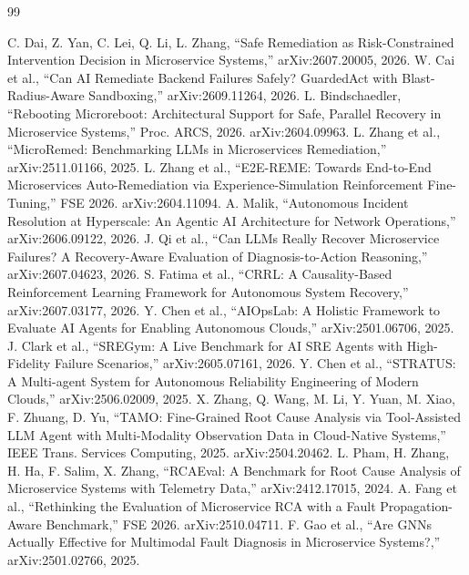 \begin{thebibliography}{99}
\setlength{\itemsep}{2pt}
\small
{} C. Dai, Z. Yan, C. Lei, Q. Li, L. Zhang, ``Safe Remediation as Risk-Constrained Intervention Decision in Microservice Systems,'' arXiv:2607.20005, 2026.
 W. Cai et al., ``Can AI Remediate Backend Failures Safely? GuardedAct with Blast-Radius-Aware Sandboxing,'' arXiv:2609.11264, 2026.
 L. Bindschaedler, ``Rebooting Microreboot: Architectural Support for Safe, Parallel Recovery in Microservice Systems,'' Proc. ARCS, 2026. arXiv:2604.09963.
 L. Zhang et al., ``MicroRemed: Benchmarking LLMs in Microservices Remediation,'' arXiv:2511.01166, 2025.
 L. Zhang et al., ``E2E-REME: Towards End-to-End Microservices Auto-Remediation via Experience-Simulation Reinforcement Fine-Tuning,'' FSE 2026. arXiv:2604.11094.
 A. Malik, ``Autonomous Incident Resolution at Hyperscale: An Agentic AI Architecture for Network Operations,'' arXiv:2606.09122, 2026.
 J. Qi et al., ``Can LLMs Really Recover Microservice Failures? A Recovery-Aware Evaluation of Diagnosis-to-Action Reasoning,'' arXiv:2607.04623, 2026.
 S. Fatima et al., ``CRRL: A Causality-Based Reinforcement Learning Framework for Autonomous System Recovery,'' arXiv:2607.03177, 2026.
 Y. Chen et al., ``AIOpsLab: A Holistic Framework to Evaluate AI Agents for Enabling Autonomous Clouds,'' arXiv:2501.06706, 2025.
 J. Clark et al., ``SREGym: A Live Benchmark for AI SRE Agents with High-Fidelity Failure Scenarios,'' arXiv:2605.07161, 2026.
 Y. Chen et al., ``STRATUS: A Multi-agent System for Autonomous Reliability Engineering of Modern Clouds,'' arXiv:2506.02009, 2025.
 X. Zhang, Q. Wang, M. Li, Y. Yuan, M. Xiao, F. Zhuang, D. Yu, ``TAMO: Fine-Grained Root Cause Analysis via Tool-Assisted LLM Agent with Multi-Modality Observation Data in Cloud-Native Systems,'' IEEE Trans. Services Computing, 2025. arXiv:2504.20462.
 L. Pham, H. Zhang, H. Ha, F. Salim, X. Zhang, ``RCAEval: A Benchmark for Root Cause Analysis of Microservice Systems with Telemetry Data,'' arXiv:2412.17015, 2024.
 A. Fang et al., ``Rethinking the Evaluation of Microservice RCA with a Fault Propagation-Aware Benchmark,'' FSE 2026. arXiv:2510.04711.
 F. Gao et al., ``Are GNNs Actually Effective for Multimodal Fault Diagnosis in Microservice Systems?,'' arXiv:2501.02766, 2025.

\end{thebibliography}
